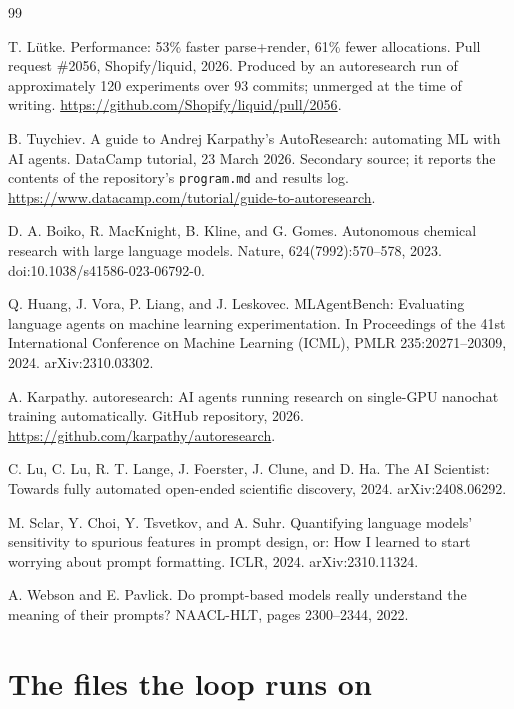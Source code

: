 \documentclass[11pt]{article}
\begin{document}
\begin{thebibliography}{99}

T. L\"utke. Performance: 53\% faster parse+render, 61\% fewer allocations.
Pull request \#2056, Shopify/liquid, 2026. Produced by an autoresearch run of
approximately 120 experiments over 93 commits; unmerged at the time of writing.
\url{https://github.com/Shopify/liquid/pull/2056}.

B. Tuychiev. A guide to Andrej Karpathy's AutoResearch: automating ML with AI
agents. DataCamp tutorial, 23 March 2026. Secondary source; it reports the
contents of the repository's \texttt{program.md} and results log.
\url{https://www.datacamp.com/tutorial/guide-to-autoresearch}.

D. A. Boiko, R. MacKnight, B. Kline, and G. Gomes. Autonomous chemical research
with large language models. Nature, 624(7992):570--578, 2023.
doi:10.1038/s41586-023-06792-0.

Q. Huang, J. Vora, P. Liang, and J. Leskovec. MLAgentBench: Evaluating language
agents on machine learning experimentation. In Proceedings of the 41st
International Conference on Machine Learning (ICML), PMLR 235:20271--20309,
2024. arXiv:2310.03302.

A. Karpathy. autoresearch: AI agents running research on single-GPU nanochat
training automatically. GitHub repository, 2026.
\url{https://github.com/karpathy/autoresearch}.

C. Lu, C. Lu, R. T. Lange, J. Foerster, J. Clune, and D. Ha. The AI Scientist:
Towards fully automated open-ended scientific discovery, 2024. arXiv:2408.06292.

M. Sclar, Y. Choi, Y. Tsvetkov, and A. Suhr. Quantifying language models'
sensitivity to spurious features in prompt design, or: How I learned to start
worrying about prompt formatting. ICLR, 2024. arXiv:2310.11324.

A. Webson and E. Pavlick. Do prompt-based models really understand the meaning
of their prompts? NAACL-HLT, pages 2300--2344, 2022.

\end{thebibliography}



\appendix

\section{The files the loop runs on}
\label{app:files}
\end{document}
